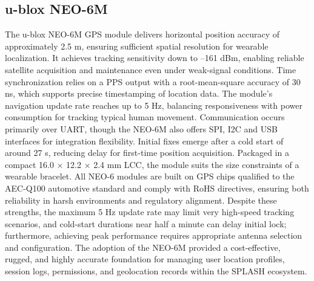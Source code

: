 \subsection{u-blox NEO-6M}
The u-blox NEO-6M \ac{GPS} module delivers horizontal position accuracy of approximately 2.5 m, ensuring sufficient spatial resolution for wearable localization. It achieves tracking sensitivity down to –161 dBm, enabling reliable satellite acquisition and maintenance even under weak-signal conditions. Time synchronization relies on a \ac{PPS} output with a root-mean-square accuracy of 30 ns, which supports precise timestamping of location data. The module’s navigation update rate reaches up to 5 \ac{Hz}, balancing responsiveness with power consumption for tracking typical human movement. Communication occurs primarily over \ac{UART}, though the NEO-6M also offers \ac{SPI}, \ac{I2C} and \ac{USB} interfaces for integration flexibility. Initial fixes emerge after a cold start of around 27 s, reducing delay for first-time position acquisition. Packaged in a compact 16.0 × 12.2 × 2.4 mm LCC, the module suits the size constraints of a wearable bracelet. All NEO-6 modules are built on GPS chips qualified to the AEC-Q100 automotive standard and comply with RoHS directives, ensuring both reliability in harsh environments and regulatory alignment. Despite these strengths, the maximum 5 \ac{Hz} update rate may limit very high-speed tracking scenarios, and cold-start durations near half a minute can delay initial lock; furthermore, achieving peak performance requires appropriate antenna selection and configuration. The adoption of the NEO-6M provided a cost-effective, rugged, and highly accurate foundation for managing user location profiles, session logs, permissions, and geolocation records within the SPLASH ecosystem\cite{neo6_1,neo6_2}.


